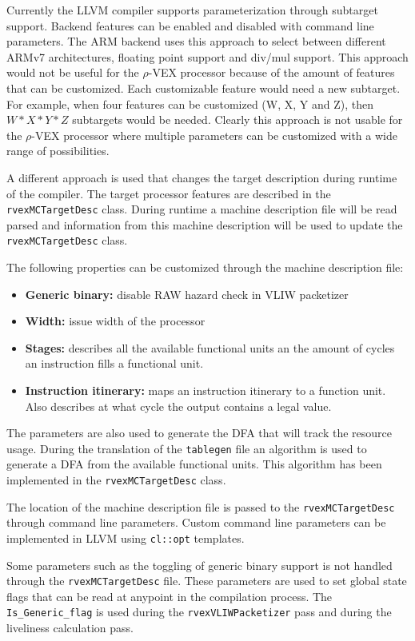 Currently the LLVM compiler supports parameterization through subtarget support. Backend features can be enabled and disabled with command line parameters. The ARM backend uses this approach to select between different ARMv7 architectures, floating point support and div/mul support. This approach would not be useful for the $\rho$-VEX processor because of the amount of features that can be customized. Each customizable feature would need a new subtarget. For example, when four features can be customized (W, X, Y and Z), then $W*X*Y*Z$ subtargets would be needed. Clearly this approach is not usable for the $\rho$-VEX processor where multiple parameters can be customized with a wide range of possibilities.

A different approach is used that changes the target description during runtime of the compiler. The target processor features are described in the \texttt{rvexMCTargetDesc} class. During runtime a machine description file will be read parsed and information from this machine description will be used to update the \texttt{rvexMCTargetDesc} class. 

The following properties can be customized through the machine description file:

\begin{itemize}
  \item \textbf{Generic binary:} disable RAW hazard check in VLIW packetizer
  \item \textbf{Width:} issue width of the processor
  \item \textbf{Stages:} describes all the available functional units an the amount of cycles an instruction fills a functional unit.
  \item \textbf{Instruction itinerary:} maps an instruction itinerary to a function unit. Also describes at what cycle the output contains a legal value.
\end{itemize}

The parameters are also used to generate the DFA that will track the resource usage. During the translation of the \texttt{tablegen} file an algorithm is used to generate a DFA from the available functional units. This algorithm has been implemented in the \texttt{rvexMCTargetDesc} class.

The location of the machine description file is passed to the \texttt{rvexMCTargetDesc} through command line parameters. Custom command line parameters can be implemented in LLVM using \texttt{cl::opt} templates.

Some parameters such as the toggling of generic binary support is not handled through the \texttt{rvexMCTargetDesc} file. These parameters are used to set global state flags that can be read at anypoint in the compilation process. The \texttt{Is\_Generic\_flag} is used during the \texttt{rvexVLIWPacketizer} pass and during the liveliness calculation pass.

